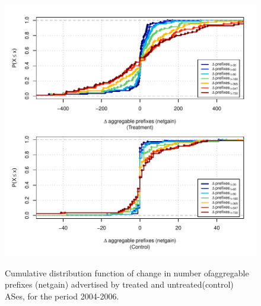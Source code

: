 \clearpage
\vspace*{16pt}
\begin{figure}[H]
\begin{centering}
\begin{singlespace}
\captionsetup{list=no}
    \includegraphics[width=6in]{figures/behavior-netgain-2004_2006-corr.pdf}
    \vspace{-2em}\\
    \caption{Cumulative distribution function of change in number ofaggregable
    prefixes (netgain) advertised by treated and untreated(control) ASes, for
    the period 2004-2006.}
\end{singlespace}
\end{centering}
\end{figure}

